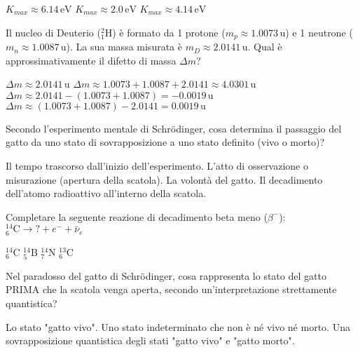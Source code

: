 \documentclass{exam}%
\begin{document}
\begin{questions}
\begin{multicols}{4}
\begin{choices}
\choice $K_{max} \approx 6.14 \, \text{eV}$%
\choice $K_{max} \approx 2.0 \, \text{eV}$%
\choice $K_{max} \approx 4.14 \, \text{eV}$%
\end{choices}%
\end{multicols}%
\question Il nucleo di Deuterio ($^2_1\text{H}$) è formato da 1 protone ($m_p \approx 1.0073 \, \text{u}$) e 1 neutrone ($m_n \approx 1.0087 \, \text{u}$). La sua massa misurata è $m_D \approx 2.0141 \, \text{u}$. Qual è approssimativamente il difetto di massa $\Delta m$?%
\vspace{0.2em}%
\begin{multicols}{2}%
\begin{choices}%
\choice $\Delta m \approx 2.0141 \, \text{u}$%
\choice $\Delta m \approx 1.0073 + 1.0087 + 2.0141 \approx 4.0301 \, \text{u}$%
\choice $\Delta m \approx 2.0141 - (1.0073 + 1.0087) = -0.0019 \, \text{u}$%
\choice $\Delta m \approx (1.0073 + 1.0087) - 2.0141 = 0.0019 \, \text{u}$%
\end{choices}%
\end{multicols}%
\question Secondo l'esperimento mentale di Schrödinger, cosa determina il passaggio del gatto da uno stato di sovrapposizione a uno stato definito (vivo o morto)?%
\vspace{0.2em}%
\begin{choices}%
\choice Il tempo trascorso dall'inizio dell'esperimento.%
\choice L'atto di osservazione o misurazione (apertura della scatola).%
\choice La volontà del gatto.%
\choice Il decadimento dell'atomo radioattivo all'interno della scatola.%
\end{choices}%
\question Completare la seguente reazione di decadimento beta meno ($\beta^-$): $^{14}_{6}\text{C} \rightarrow ? + e^- + \bar{\nu}_e$%
\vspace{0.2em}%
\begin{multicols}{4}%
\begin{choices}%
\choice $^{14}_{6}\text{C}$%
\choice $^{14}_{5}\text{B}$%
\choice $^{14}_{7}\text{N}$%
\choice $^{13}_{6}\text{C}$%
\end{choices}%
\end{multicols}%
\question Nel paradosso del gatto di Schrödinger, cosa rappresenta lo stato del gatto PRIMA che la scatola venga aperta, secondo un'interpretazione strettamente quantistica?%
\vspace{0.2em}%
\begin{choices}%
\choice Lo stato "gatto vivo".%
\choice Uno stato indeterminato che non è né vivo né morto.%
\choice Una sovrapposizione quantistica degli stati "gatto vivo" e "gatto morto".%

\end{choices}
\end{questions}
\end{document}
